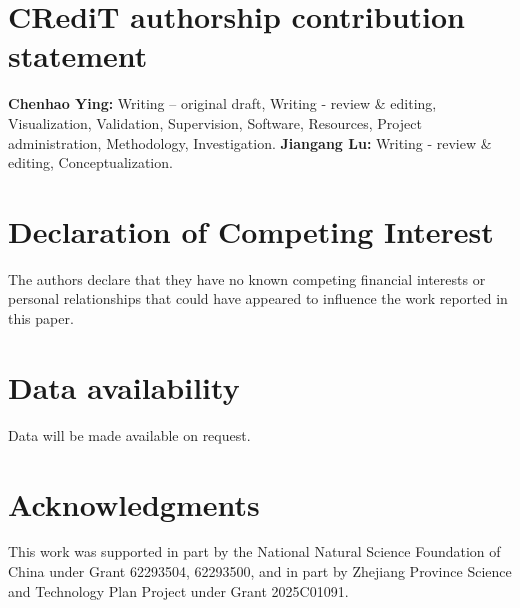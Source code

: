 \documentclass[final,3p,times]{elsarticle}
\begin{document}
\section*{CRediT authorship contribution statement}
\indent \textbf{Chenhao Ying:} Writing – original draft, Writing - review \& editing, Visualization, Validation, Supervision, Software, Resources, Project administration, Methodology, Investigation. \textbf{Jiangang Lu:} Writing - review \& editing, Conceptualization.

\section*{Declaration of Competing Interest}
\indent The authors declare that they have no known competing financial interests or personal relationships that could have appeared to influence the work reported in this paper.

\section*{Data availability}
Data will be made available on request.

\section*{Acknowledgments}
This work was supported in part by the National Natural Science Foundation of China under Grant 62293504, 62293500, and in part by Zhejiang Province Science and Technology Plan Project under Grant 2025C01091.














  
 
\end{document}

